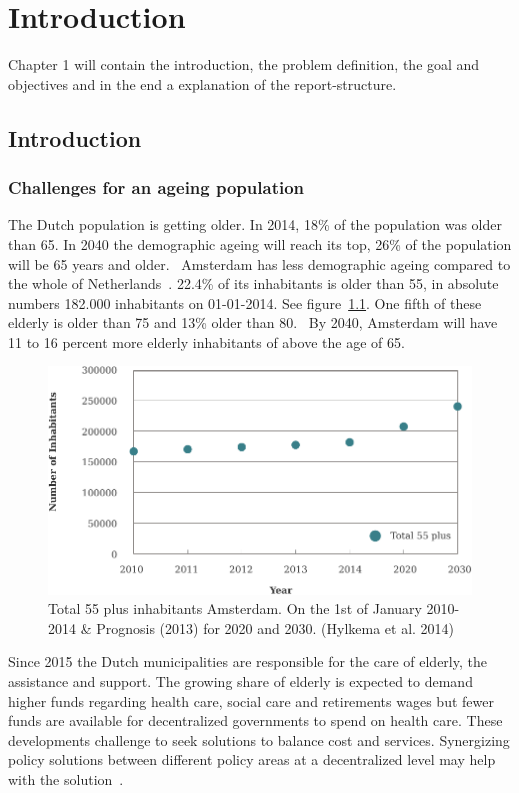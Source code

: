 \chapter[Introduction]{Introduction}
Chapter 1 will contain the introduction, the problem definition, the goal and objectives and in the end a explanation of the report-structure.

\section[Introduction]{Introduction}
\subsection{Challenges for an ageing population}
The Dutch population is getting older. In 2014, 18\% of the population was older than 65. In 2040 the demographic ageing will reach its top, 26\% of the population will be 65 years and older.~\cite{Hylkema2014} Amsterdam has less demographic ageing compared to the whole of Netherlands~\cite{Hylkema2014}. 22.4\% of its inhabitants is older than 55, in absolute numbers 182.000 inhabitants on 01-01-2014. See figure~\ref{demo}. One fifth of these elderly is older than 75 and 13\% older than 80.~\cite{Hylkema2014} By 2040, Amsterdam will have 11 to 16 percent more elderly inhabitants of above the age of 65. 

\begin{figure}[h]
\includegraphics[width=\textwidth]{img/I1_number_elderly.pdf}
\centering
\caption[Total 55 plus inhabitants Amsterdam.]{
Total 55 plus inhabitants Amsterdam. On the 1st of January 2010-2014 \& Prognosis (2013) for 2020 and 2030. (Hylkema et al. 2014)} 
\label{demo}
\end{figure} 

Since 2015 the Dutch municipalities are responsible for the care of elderly, the assistance and support. The growing share of elderly is expected to demand higher funds regarding health care, social care and retirements wages but fewer funds are available for decentralized governments to spend on health care. These developments challenge to seek solutions to balance cost and services. Synergizing policy solutions between different policy areas at a decentralized level may help with the solution~\cite{Hylkema2014}. 

